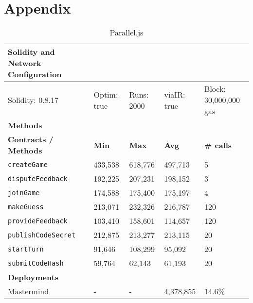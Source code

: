 \chapter{Appendix}


\begin{table}[ht]
\centering
\begin{tabular}{|l|l|l|l|l|}
\hline
\textbf{Solidity and Network Configuration} & \multicolumn{4}{l|}{} \\ \hline
Solidity: 0.8.17 & Optim: true & Runs: 2000 & viaIR: true & Block: 30,000,000 gas \\ \hline
\textbf{Methods} & \multicolumn{4}{l|}{} \\ \hline
\textbf{Contracts / Methods} & \textbf{Min} & \textbf{Max} & \textbf{Avg} & \textbf{\# calls} \\ \hline
\texttt{createGame} & 433,538 & 618,776 & 497,713 & 5 \\ \hline
\texttt{disputeFeedback} & 192,225 & 207,231 & 198,152 & 3 \\ \hline
\texttt{joinGame} & 174,588 & 175,400 & 175,197 & 4 \\ \hline
\texttt{makeGuess} & 213,071 & 232,326 & 216,787 & 120 \\ \hline
\texttt{provideFeedback} & 103,410 & 158,601 & 114,657 & 120 \\ \hline
\texttt{publishCodeSecret} & 212,875 & 213,277 & 213,115 & 20 \\ \hline
\texttt{startTurn} & 91,646 & 108,299 & 95,092 & 20 \\ \hline
\texttt{submitCodeHash} & 59,764 & 62,143 & 61,193 & 20 \\ \hline
\textbf{Deployments} & \multicolumn{4}{l|}{} \\ \hline
Mastermind & - & - & 4,378,855 & 14.6\% \\ \hline
\end{tabular}
\caption{Parallel.js}
\label{tab:parallel-1}
\end{table}

